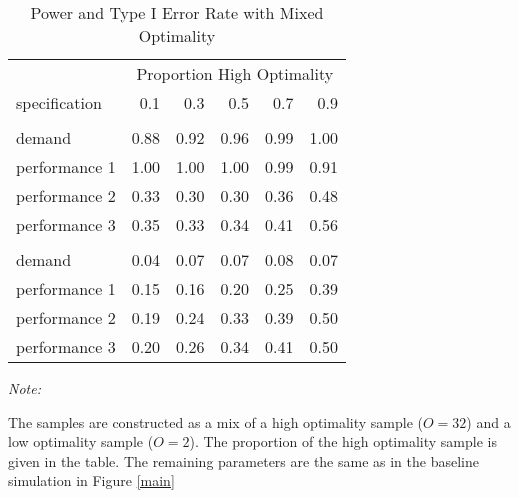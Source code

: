 \begin{table}

\caption{\label{tab:mix-optimality-table}Power and Type I Error Rate with Mixed Optimality}
\centering
\begin{threeparttable}
\begin{tabular}[t]{lrrrrr}
\toprule
\multicolumn{1}{c}{ } & \multicolumn{5}{c}{Proportion High Optimality} \\
\cmidrule(l{3pt}r{3pt}){2-6}
specification & 0.1 & 0.3 & 0.5 & 0.7 & 0.9\\
\midrule
\addlinespace[0.3em]
\multicolumn{6}{c}{\textbf{Power}}\\
\hspace{1em}demand & 0.88 & 0.92 & 0.96 & 0.99 & 1.00\\
\hspace{1em}performance 1 & 1.00 & 1.00 & 1.00 & 0.99 & 0.91\\
\hspace{1em}performance 2 & 0.33 & 0.30 & 0.30 & 0.36 & 0.48\\
\hspace{1em}performance 3 & 0.35 & 0.33 & 0.34 & 0.41 & 0.56\\
\addlinespace[0.3em]
\multicolumn{6}{c}{\textbf{Type I}}\\
\hspace{1em}demand & 0.04 & 0.07 & 0.07 & 0.08 & 0.07\\
\hspace{1em}performance 1 & 0.15 & 0.16 & 0.20 & 0.25 & 0.39\\
\hspace{1em}performance 2 & 0.19 & 0.24 & 0.33 & 0.39 & 0.50\\
\hspace{1em}performance 3 & 0.20 & 0.26 & 0.34 & 0.41 & 0.50\\
\bottomrule
\end{tabular}
\begin{tablenotes}
\item \textit{Note: } 
\item The samples are constructed as a mix of a high optimality sample ($O=32$) and a low optimality sample ($O=2$). The proportion of the high optimality sample is given in the table. The remaining parameters are the same as in the baseline simulation in Figure \ref{main}
\end{tablenotes}
\end{threeparttable}
\end{table}